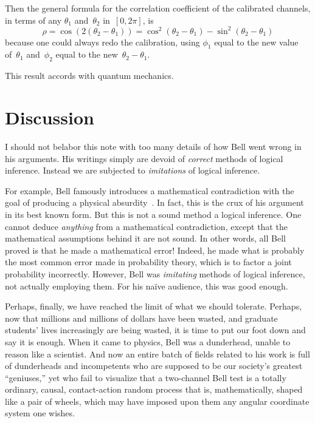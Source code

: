 \documentclass[9pt,technote]{IEEEtran}
\begin{document}
Then the general formula for the correlation coefficient of the
calibrated channels, in terms of any $\theta_1$ and~$\theta_2$
in~$[0,2\pi]$, is
\begin{equation}
  \rho = \cos(2(\theta_2-\theta_1)) = \cos^2(\theta_2-\theta_1) - \sin^2(\theta_2-\theta_1)
\end{equation}
because one could always redo the calibration, using $\phi_1$ equal to
the new value of~$\theta_1$ and~$\phi_2$ equal to the
new~$\theta_2-\theta_1$.

This result accords with quantum mechanics.

\section{Discussion}

I should not belabor this note with too many details of how Bell went
wrong in his arguments. His writings simply are devoid of
{\em{correct}} methods of logical inference. Instead we are subjected
to {\em{imitations}} of logical inference.

For example, Bell famously introduces a mathematical contradiction
with the goal of producing a physical
absurdity~\cite{bertlmann:manuscript}. In fact, this is the crux of
his argument in its best known form. But this is not a sound method a
logical inference. One cannot deduce {\em{anything}} from a
mathematical contradiction, except that the mathematical assumptions
behind it are not sound. In other words, all Bell proved is that he
made a mathematical error! Indeed, he made what is probably the most
common error made in probability theory, which is to factor a joint
probability incorrectly. However, Bell was {\em{imitating}} methods of
logical inference, not actually employing them. For his naïve
audience, this was good enough.

Perhaps, finally, we have reached the limit of what we should
tolerate. Perhaps, now that millions and millions of dollars have been
wasted, and graduate students' lives increasingly are being wasted, it
is time to put our foot down and say it is enough. When it came to
physics, Bell was a dunderhead, unable to reason like a scientist. And
now an entire batch of fields related to his work is full of
dunderheads and incompetents who are supposed to be our society’s
greatest ``geniuses,'' yet who fail to visualize that a two-channel
Bell test is a totally ordinary, causal, contact-action random process
that is, mathematically, shaped like a pair of wheels, which may have
imposed upon them any angular coordinate system one wishes.
\end{document}
